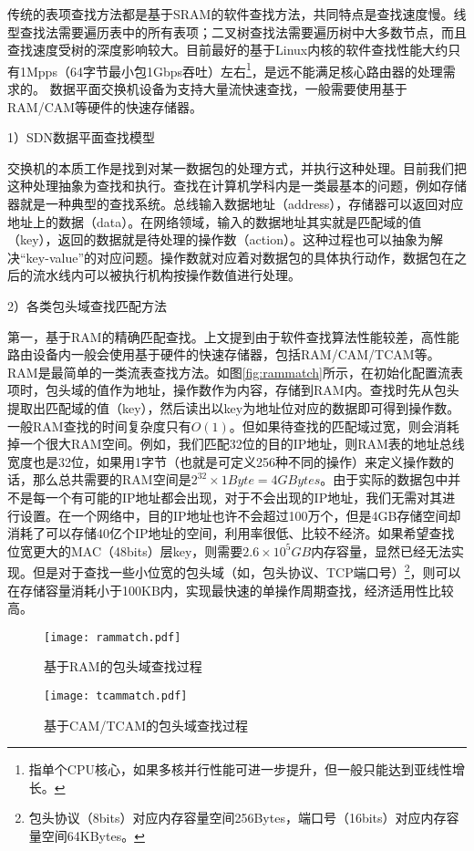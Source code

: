 \label{chap242}
传统的表项查找方法都是基于SRAM的软件查找方法，共同特点是查找速度慢。线型查找法需要遍历表中的所有表项；二叉树查找法需要遍历树中大多数节点，而且查找速度受树的深度影响较大。目前最好的基于Linux内核的软件查找性能大约只有1Mpps（64字节最小包1Gbps吞吐）左右\footnote{指单个CPU核心，如果多核并行性能可进一步提升，但一般只能达到亚线性增长。}，是远不能满足核心路由器的处理需求的。
数据平面交换机设备为支持大量流快速查找，一般需要使用基于RAM/CAM等硬件的快速存储器。

1）SDN数据平面查找模型

交换机的本质工作是找到对某一数据包的处理方式，并执行这种处理。目前我们把这种处理抽象为查找和执行。查找在计算机学科内是一类最基本的问题，例如存储器就是一种典型的查找系统。总线输入数据地址（address），存储器可以返回对应地址上的数据（data）。在网络领域，输入的数据地址其实就是匹配域的值（key），返回的数据就是待处理的操作数（action）。这种过程也可以抽象为解决“key-value”的对应问题。操作数就对应着对数据包的具体执行动作，数据包在之后的流水线内可以被执行机构按操作数值进行处理。

2）各类包头域查找匹配方法

第一，基于RAM的精确匹配查找。上文提到由于软件查找算法性能较差，高性能路由设备内一般会使用基于硬件的快速存储器，包括RAM/CAM/TCAM等。RAM是最简单的一类流表查找方法。如图\ref{fig:rammatch}所示，在初始化配置流表项时，包头域的值作为地址，操作数作为内容，存储到RAM内。查找时先从包头提取出匹配域的值（key），然后读出以key为地址位对应的数据即可得到操作数。一般RAM查找的时间复杂度只有$O(1)$。但如果待查找的匹配域过宽，则会消耗掉一个很大RAM空间。例如，我们匹配32位的目的IP地址，则RAM表的地址总线宽度也是32位，如果用1字节（也就是可定义256种不同的操作）来定义操作数的话，那么总共需要的RAM空间是$2^{32}\times 1Byte=4GBytes$。由于实际的数据包中并不是每一个有可能的IP地址都会出现，对于不会出现的IP地址，我们无需对其进行设置。在一个网络中，目的IP地址也许不会超过100万个，但是4GB存储空间却消耗了可以存储40亿个IP地址的空间，利用率很低、比较不经济。如果希望查找位宽更大的MAC（48bits）层key，则需要$2.6\times 10^{5}GB$内存容量，显然已经无法实现。但是对于查找一些小位宽的包头域（如，包头协议、TCP端口号）\footnote{包头协议（8bits）对应内存容量空间256Bytes，端口号（16bits）对应内存容量空间64KBytes。}，则可以在存储容量消耗小于100KB内，实现最快速的单操作周期查找，经济适用性比较高。

\begin{figure}[htbp]
	\centering
	\begin{minipage}[t]{0.39\textwidth}
		\centering
		\texttt{[image: rammatch.pdf]}
		\caption{基于RAM的包头域查找过程} \label{fig:rammatch}
	\end{minipage}
	\begin{minipage}[t]{0.6\textwidth}
		\centering
		\texttt{[image: tcammatch.pdf]}%
		\caption{基于CAM/TCAM的包头域查找过程} \label{fig:tcammatch}
	\end{minipage}
\end{figure}

